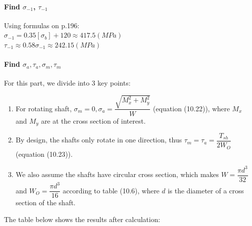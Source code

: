 \paragraph{Find $ \sigma_{-1}$, $ \tau_{-1} $} Using formulas on p.196:\\
$ \sigma_{-1} = 0.35[\sigma_b] + 120 \approx 417.5 \unit{(MPa)} $\\
$ \tau_{-1} \approx 0.58\sigma_{-1} \approx 242.15 \unit{(MPa)} $

\paragraph{Find $ \sigma_{a}, \tau_{a}, \sigma_{m}, \tau_{m} $} For this part, we divide into 3 key points:
\begin{enumerate}
	\item For rotating shaft, $ \sigma_{m} = 0, \sigma_a = \dfrac{\sqrt{M_x^2+M_y^2}}{W} $ (equation (10.22)), where $ M_x $ and $ M_y $ are at the cross section of interest.
	\item By design, the shafts only rotate in one direction, thus $ \tau_m = \tau_a = \dfrac{T_{sh}}{2W_O} $ (equation (10.23)).
	\item We also assume the shafts have circular cross section, which makes $ W = \dfrac{\pi d^3}{32} $ and $ W_O = \dfrac{\pi d^3}{16} $ according to table (10.6), where $ d $ is the diameter of a cross section of the shaft.
\end{enumerate}
The table below shows the results after calculation:\newpage
